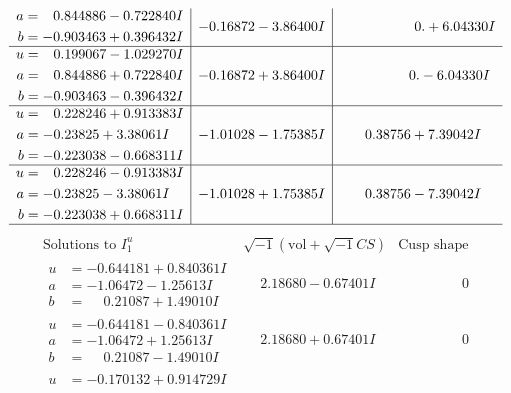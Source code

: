 \documentclass[1p]{elsarticle_modified}
\theoremstyle{definition}
\newcommand{\I}{\sqrt{-1}}
\begin{document}
$$\begin{array}{c|c|c}
\begin{aligned}
a &= \phantom{-}0.844886 - 0.722840 I \\
b &= -0.903463 + 0.396432 I\end{aligned}
 & -0.16872 - 3.86400 I & \phantom{-0.000000 -}0. + 6.04330 I \\ \hline\begin{aligned}
u &= \phantom{-}0.199067 - 1.029270 I \\
a &= \phantom{-}0.844886 + 0.722840 I \\
b &= -0.903463 - 0.396432 I\end{aligned}
 & -0.16872 + 3.86400 I & \phantom{-0.000000 } 0. - 6.04330 I \\ \hline\begin{aligned}
u &= \phantom{-}0.228246 + 0.913383 I \\
a &= -0.23825 + 3.38061 I \\
b &= -0.223038 - 0.668311 I\end{aligned}
 & -1.01028 - 1.75385 I & \phantom{-}0.38756 + 7.39042 I \\ \hline\begin{aligned}
u &= \phantom{-}0.228246 - 0.913383 I \\
a &= -0.23825 - 3.38061 I \\
b &= -0.223038 + 0.668311 I\end{aligned}
 & -1.01028 + 1.75385 I & \phantom{-}0.38756 - 7.39042 I\\
 \hline 
 \end{array}$$\newpage$$\begin{array}{c|c|c}  
\text{Solutions to }I^u_{1}& \I (\text{vol} + \sqrt{-1}CS) & \text{Cusp shape}\\
 \hline 
\begin{aligned}
u &= -0.644181 + 0.840361 I \\
a &= -1.06472 - 1.25613 I \\
b &= \phantom{-}0.21087 + 1.49010 I\end{aligned}
 & \phantom{-}2.18680 - 0.67401 I & \phantom{-0.000000 } 0 \\ \hline\begin{aligned}
u &= -0.644181 - 0.840361 I \\
a &= -1.06472 + 1.25613 I \\
b &= \phantom{-}0.21087 - 1.49010 I\end{aligned}
 & \phantom{-}2.18680 + 0.67401 I & \phantom{-0.000000 } 0 \\ \hline\begin{aligned}
u &= -0.170132 + 0.914729 I \\

\end{aligned}
\end{array}$$
\end{document}
